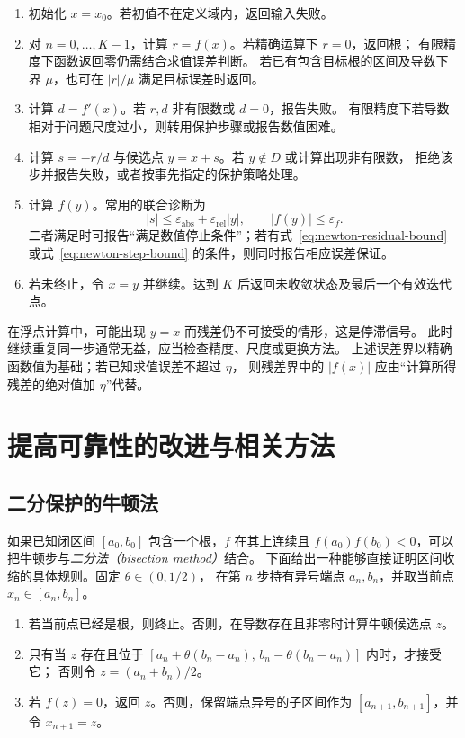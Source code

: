 \documentclass[UTF8,12pt,a4paper,fontset=fandol]{ctexart}
\begin{document}
\begin{enumerate}
  \item 初始化 $x=x_0$。若初值不在定义域内，返回输入失败。
  \item 对 $n=0,\ldots,K-1$，计算 $r=f(x)$。若精确运算下 $r=0$，返回根；
        有限精度下函数返回零仍需结合求值误差判断。
        若已有包含目标根的区间及导数下界 $\mu$，也可在 $|r|/\mu$ 满足目标误差时返回。
  \item 计算 $d=f'(x)$。若 $r,d$ 非有限数或 $d=0$，报告失败。
        有限精度下若导数相对于问题尺度过小，则转用保护步骤或报告数值困难。
  \item 计算 $s=-r/d$ 与候选点 $y=x+s$。若 $y\notin D$ 或计算出现非有限数，
        拒绝该步并报告失败，或者按事先指定的保护策略处理。
  \item 计算 $f(y)$。常用的联合诊断为
        \[
          |s|\le\varepsilon_{\mathrm{abs}}+\varepsilon_{\mathrm{rel}}|y|,
          \qquad |f(y)|\le\varepsilon_f.
        \]
        二者满足时可报告“满足数值停止条件”；若有式~\eqref{eq:newton-residual-bound}
        或式~\eqref{eq:newton-step-bound} 的条件，则同时报告相应误差保证。
  \item 若未终止，令 $x=y$ 并继续。达到 $K$ 后返回未收敛状态及最后一个有效迭代点。
\end{enumerate}

在浮点计算中，可能出现 $y=x$ 而残差仍不可接受的情形，这是停滞信号。
此时继续重复同一步通常无益，应当检查精度、尺度或更换方法。
上述误差界以精确函数值为基础；若已知求值误差不超过 $\eta$，
则残差界中的 $|f(x)|$ 应由“计算所得残差的绝对值加 $\eta$”代替。

\section{提高可靠性的改进与相关方法}
\label{sec:newton-variants}

\subsection{二分保护的牛顿法}

如果已知闭区间 $[a_0,b_0]$ 包含一个根，$f$ 在其上连续且
$f(a_0)f(b_0)<0$，可以把牛顿步与\emph{二分法（bisection method）}结合。
下面给出一种能够直接证明区间收缩的具体规则。固定 $\theta\in(0,1/2)$，
在第 $n$ 步持有异号端点 $a_n,b_n$，并取当前点 $x_n\in[a_n,b_n]$。

\begin{enumerate}
  \item 若当前点已经是根，则终止。否则，在导数存在且非零时计算牛顿候选点 $z$。
  \item 只有当 $z$ 存在且位于
        $[a_n+\theta(b_n-a_n),\,b_n-\theta(b_n-a_n)]$ 内时，才接受它；
        否则令 $z=(a_n+b_n)/2$。
  \item 若 $f(z)=0$，返回 $z$。否则，保留端点异号的子区间作为
        $[a_{n+1},b_{n+1}]$，并令 $x_{n+1}=z$。
\end{enumerate}
\end{document}
